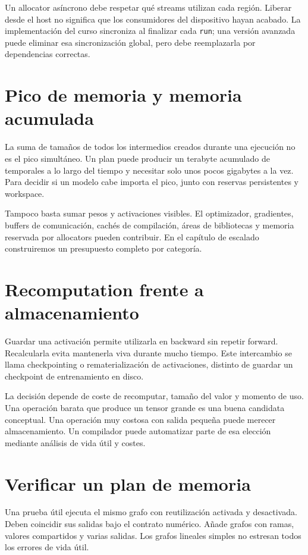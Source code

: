 \documentclass[12pt,a4paper,oneside]{report}
\begin{document}
Un allocator asíncrono debe respetar qué streams utilizan cada región. Liberar desde el host no significa que los consumidores del dispositivo hayan acabado. La implementación del curso sincroniza al finalizar cada \texttt{run}; una versión avanzada puede eliminar esa sincronización global, pero debe reemplazarla por dependencias correctas.

\section{Pico de memoria y memoria acumulada}
La suma de tamaños de todos los intermedios creados durante una ejecución no es el pico simultáneo. Un plan puede producir un terabyte acumulado de temporales a lo largo del tiempo y necesitar solo unos pocos gigabytes a la vez. Para decidir si un modelo cabe importa el pico, junto con reservas persistentes y workspace.

Tampoco basta sumar pesos y activaciones visibles. El optimizador, gradientes, buffers de comunicación, cachés de compilación, áreas de bibliotecas y memoria reservada por allocators pueden contribuir. En el capítulo de escalado construiremos un presupuesto completo por categoría.

\section{Recomputation frente a almacenamiento}
Guardar una activación permite utilizarla en backward sin repetir forward. Recalcularla evita mantenerla viva durante mucho tiempo. Este intercambio se llama checkpointing o rematerialización de activaciones, distinto de guardar un checkpoint de entrenamiento en disco.

La decisión depende de coste de recomputar, tamaño del valor y momento de uso. Una operación barata que produce un tensor grande es una buena candidata conceptual. Una operación muy costosa con salida pequeña puede merecer almacenamiento. Un compilador puede automatizar parte de esa elección mediante análisis de vida útil y costes.

\section{Verificar un plan de memoria}
Una prueba útil ejecuta el mismo grafo con reutilización activada y desactivada. Deben coincidir sus salidas bajo el contrato numérico. Añade grafos con ramas, valores compartidos y varias salidas. Los grafos lineales simples no estresan todos los errores de vida útil.
\end{document}
